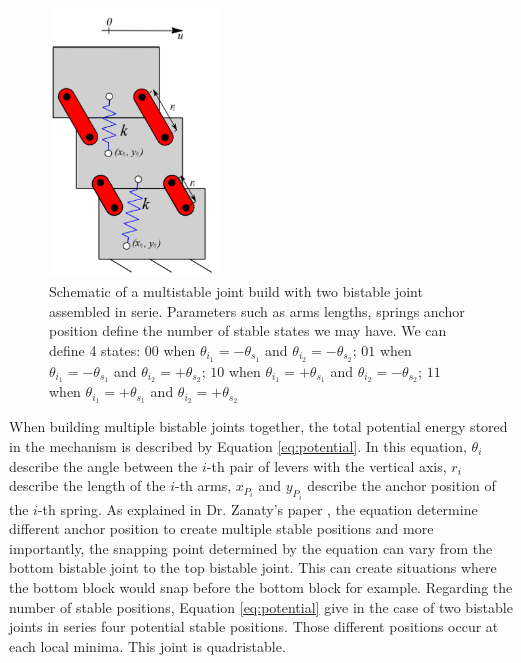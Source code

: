         \begin{figure}
        \centering
        \includegraphics[width=0.40\textwidth]{images/multistable.png}
        \caption{Schematic of a multistable joint build with two bistable joint assembled in serie. Parameters such as arms lengths, springs anchor position define the number of stable states we may have. We can define 4 states: $00$ when $\theta_{i_1} = -\theta_{s_1}$ and $\theta_{i_2} = -\theta_{s_2}$; $01$ when $\theta_{i_1} = -\theta_{s_1}$ and $\theta_{i_2} = +\theta_{s_2}$; $10$ when $\theta_{i_1} = +\theta_{s_1}$ and $\theta_{i_2} = -\theta_{s_2}$; $11$ when $\theta_{i_1} = +\theta_{s_1}$ and $\theta_{i_2} = +\theta_{s_2}$}
        \label{fig:joint_multistable}
        \end{figure}
        
        When building multiple bistable joints together, the total potential energy stored in the mechanism is described by Equation \ref{eq:potential}. In this equation, $\theta_i$ describe the angle between the $i$-th pair of levers with the vertical axis, $r_i$ describe the length of the $i$-th arms, $x_{P_i}$ and $y_{P_i}$ describe the anchor position of the $i$-th spring. As explained in Dr. Zanaty's paper \cite{mo_main_paper}, the equation determine different anchor position to create multiple stable positions and more importantly, the snapping point determined by the equation can vary from the bottom bistable joint to the top bistable joint. This can create situations where the bottom block would snap before the bottom block for example. Regarding the number of stable positions, Equation \ref{eq:potential} give in the case of two bistable joints in series four potential stable positions. Those different positions occur at each local minima. This joint is quadristable.

